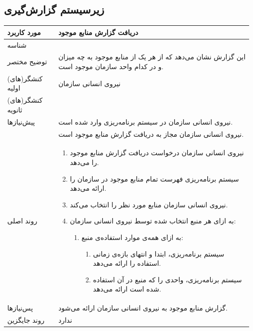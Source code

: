 \subsection{زیرسیستم گزارش‌گیری}

\begin{table}[H]
	\centering
	\begin{tabular}{|p{3cm}|p{10cm}|}
		\hline
		
		
		مورد کاربرد & دریافت گزارش منابع موجود  \\
		\hline
		
		شناسه & 
		\stepcounter{usecase_ID}
		
		\arabic{usecase_ID} \\
		
		\hline
		
		توضیح مختصر & این گزارش نشان می‌دهد که از هر یک از منابع موجود به چه میزان و در کدام واحد سازمان موجود است. \\
		\hline
		
		کنشگر(های) اولیه& نیروی انسانی سازمان \\
		\hline
		
		کنشگر(های) ثانویه&  \\
		\hline
		
		پیش‌نیازها
		& نیروی انسانی سازمان در سیستم برنامه‌ریزی وارد شده است.\\
		& نیروی انسانی سازمان مجاز به دریافت گزارش منابع موجود است. \\
		\hline
		
		
		روند اصلی &
		\begin{enumerate}[topsep=0cm,leftmargin=0.5cm]
			\item نیروی انسانی سازمان درخواست دریافت گزارش منابع موجود را می‌دهد.
			\item سیستم برنامه‌ریزی فهرست تمام منابع موجود در سازمان را ارائه می‌دهد.
			\item نیروی انسانی سازمان منابع مورد نظر را انتخاب می‌کند.
			\item به ازای هر منبع انتخاب شده توسط نیروی انسانی سازمان:
			\begin{enumerate}[topsep=0cm,leftmargin=0.5cm]
				\item به ازای همه‌ی موارد استفاده‌ی منبع:
				\begin{enumerate}[topsep=0cm,leftmargin=0.5cm]
					\item سیستم برنامه‌ریزی، ابتدا و انتهای بازه‌ی زمانی استفاده را ارائه می‌دهد.
					\item سیستم برنامه‌ریزی، واحدی را که منبع در آن استفاده شده است ارائه می‌دهد.
				\end{enumerate}
			\end{enumerate}
		\end{enumerate} \\
		\hline
		
		پس‌نیازها &
		گزارش منابع موجود به نیروی انسانی سازمان ارائه می‌شود. \\
		\hline
		
		روند جایگزین
		& ندارد \\
		\hline
		
	\end{tabular}
\end{table}


